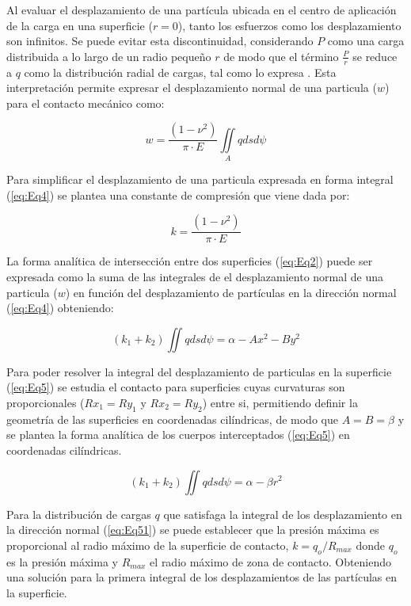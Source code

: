 \documentclass[main]{subfiles}
\begin{document}
Al evaluar el desplazamiento de una partícula ubicada en el centro de aplicación de la carga en una superficie ($r=0$), tanto los esfuerzos como los desplazamiento son infinitos. Se puede evitar esta discontinuidad, considerando $P$ como una carga distribuida a lo largo de un radio pequeño $r$ de modo que el término $\frac{P}{r}$ se reduce a $q$ como la distribución radial de cargas, tal como lo expresa \citet{timoshenko1970theory}. Esta interpretación permite expresar el desplazamiento normal de una particula ($w$) para el contacto mecánico como:

\begin{equation}
\label{eq:Eq4}
w=\frac{(1-\nu^2)}{\pi \cdot E}  \iint\limits_{A} q ds d\psi
\end{equation}


Para simplificar el desplazamiento de una particula expresada en forma integral (\ref{eq:Eq4}) se plantea una constante de compresión que viene dada por:

\begin{equation}
k=\frac{(1-\nu^2)}{\pi \cdot E}
\end{equation}
  
  La forma analítica de intersección entre dos superficies (\ref{eq:Eq2}) puede ser expresada como la suma de las integrales de el desplazamiento normal de una particula ($w$) en función del desplazamiento de partículas en la dirección normal (\ref{eq:Eq4}) obteniendo:
  
  \begin{equation}
  \label{eq:Eq5}
  \left(
  k_1+k_2
  \right)
  \iint q ds d\psi =\alpha-Ax^2-By^2
  \end{equation}

Para poder resolver la integral del desplazamiento de particulas en la superficie (\ref{eq:Eq5}) se estudia el contacto para superficies cuyas curvaturas son proporcionales ($Rx_1=Ry_1$ y $Rx_2=Ry_2$) entre si, permitiendo definir la geometría de las superficies en coordenadas cilíndricas, de modo que $A=B=\beta$ y se plantea la forma analítica de los cuerpos interceptados (\ref{eq:Eq5}) en coordenadas cilíndricas.

  \begin{equation}
  \label{eq:Eq51}
  \left(
  k_1+k_2
  \right)
  \iint q ds d\psi =\alpha-\beta r^2
  \end{equation}
  
  Para la distribución de cargas $q$ que satisfaga la integral de los desplazamiento en la dirección normal (\ref{eq:Eq51}) se puede establecer que la presión máxima es proporcional al radio máximo de la superficie de contacto, $k=q_o/R_{max}$ donde $q_o$ es la presión máxima y $R_{max}$ el radio máximo de zona de contacto. Obteniendo una solución para la primera integral de los desplazamientos de las partículas en la superficie.
\end{document}
